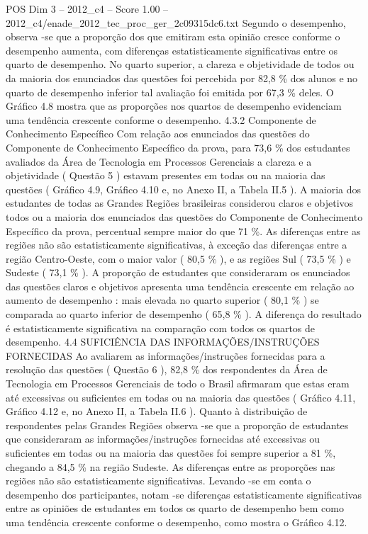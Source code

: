 \begin{textsample}{POS Dim 3 – 2012\_c4 – Score 1.00 – 2012\_c4/enade\_2012\_tec\_proc\_ger\_2c09315dc6.txt}
Segundo o desempenho, observa -se que a proporção dos que emitiram esta opinião cresce conforme o desempenho aumenta, com diferenças estatisticamente significativas entre os quarto de desempenho.
No quarto superior, a clareza e objetividade de todos ou da maioria dos enunciados das questões foi percebida por 82,8 \% dos alunos e no quarto de desempenho inferior tal avaliação foi emitida por 67,3 \% deles.
O Gráfico 4.8 mostra que as proporções nos quartos de desempenho evidenciam uma tendência crescente conforme o desempenho. 4.3.2 Componente de Conhecimento Específico Com relação aos enunciados das questões do Componente de Conhecimento Específico da prova, para 73,6 \% dos estudantes avaliados da Área de Tecnologia em Processos Gerenciais a clareza e a objetividade ( Questão 5 ) estavam presentes em todas ou na maioria das questões ( Gráfico 4.9, Gráfico 4.10 e, no Anexo II, a Tabela II.5 ).
A maioria dos estudantes de todas as Grandes Regiões brasileiras considerou claros e objetivos todos ou a maioria dos enunciados das questões do Componente de Conhecimento Específico da prova, percentual sempre maior do que 71 \%.
As diferenças entre as regiões não são estatisticamente significativas, à exceção das diferenças entre a região Centro-Oeste, com o maior valor ( 80,5 \% ), e as regiões Sul ( 73,5 \% ) e Sudeste ( 73,1 \% ).
A proporção de estudantes que consideraram os enunciados das questões claros e objetivos apresenta uma tendência crescente em relação ao aumento de desempenho : mais elevada no quarto superior ( 80,1 \% ) se comparada ao quarto inferior de desempenho ( 65,8 \% ).
A diferença do resultado é estatisticamente significativa na comparação com todos os quartos de desempenho. 4.4 SUFICIÊNCIA DAS INFORMAÇÕES/INSTRUÇÕES FORNECIDAS Ao avaliarem as informações/instruções fornecidas para a resolução das questões ( Questão 6 ), 82,8 \% dos respondentes da Área de Tecnologia em Processos Gerenciais de todo o Brasil afirmaram que estas eram até excessivas ou suficientes em todas ou na maioria das questões ( Gráfico 4.11, Gráfico 4.12 e, no Anexo II, a Tabela II.6 ).
Quanto à distribuição de respondentes pelas Grandes Regiões observa -se que a proporção de estudantes que consideraram as informações/instruções fornecidas até excessivas ou suficientes em todas ou na maioria das questões foi sempre superior a 81 \%, chegando a 84,5 \% na região Sudeste.
As diferenças entre as proporções nas regiões não são estatisticamente significativas.
Levando -se em conta o desempenho dos participantes, notam -se diferenças estatisticamente significativas entre as opiniões de estudantes em todos os quarto de desempenho bem como uma tendência crescente conforme o desempenho, como mostra o Gráfico 4.12.

\end{textsample}
